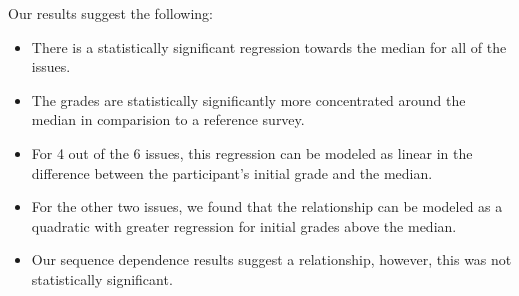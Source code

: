Our results suggest the following:
\begin{itemize}
\item There is a statistically significant regression towards the median for all of the issues.
\item The grades are statistically significantly more concentrated around the median in comparision to a reference survey.
\item For 4 out of the 6 issues, this regression can be modeled as linear in the difference between the participant's initial grade and the median.
\item For the other two issues, we found that the relationship can be modeled as a quadratic with greater regression for initial grades above the median.
\item Our sequence dependence results suggest a relationship, however, this was not statistically significant.
\end{itemize}
